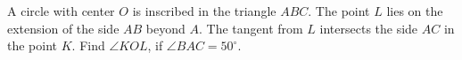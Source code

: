 \problem
A circle with center $O$ is inscribed in the triangle $ABC$.
The point $L$ lies on the extension of the side $AB$ beyond $A$.
The tangent from $L$ intersects the side $AC$ in the point $K$. 
Find $\angle KOL$, if $\angle BAC = 50^\circ$.
\solution
\endproblem
